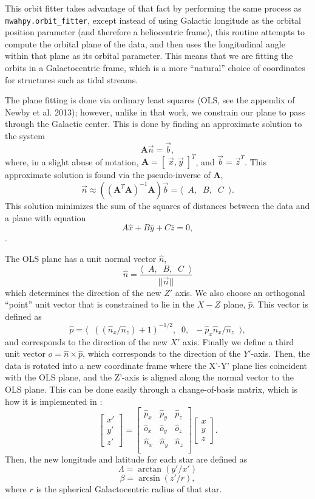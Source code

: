 \documentclass{article}
\begin{document}
This orbit fitter takes advantage of that fact by performing the same process as \verb!mwahpy.orbit_fitter!, except instead of using Galactic longitude as the orbital position parameter (and therefore a heliocentric frame), this routine attempts to compute the orbital plane of the data, and then uses the longitudinal angle within that plane as its orbital parameter. This means that we are fitting the orbits in a Galactocentric frame, which is a more ``natural'' choice of coordinates for structures such as tidal streams. 

The plane fitting is done via ordinary least squares (OLS, see the appendix of Newby et al. 2013); however, unlike in that work, we constrain our plane to pass through the Galactic center. This is done by finding an approximate solution to the system \[
\mathbf{A} \vec{n} = \vec{b},
\] where, in a slight abuse of notation, $\mathbf{A} = [ \;\vec{x}, \vec{y}\; ]^T$, and $\vec{b} = \vec{z}^T$. This approximate solution is found via the pseudo-inverse of $\mathbf{A}$, \[
\vec{n} \approx \left( \left(\mathbf{A}^T \mathbf{A}\right)^{-1} \mathbf{A} \right) \vec{b} = \langle\;\; A,\;\; B, \;\; C \;\; \rangle.
\] This solution minimizes the sum of the squares of distances between the data and a plane with equation \[
A\hat{x} + B\hat{y} + C\hat{z} = 0,
\].

The OLS plane has a unit normal vector $\hat{n}$, \[
\hat{n} = \frac{\langle \;\; A, \;\; B, \;\; C \;\; \rangle}{||\vec{n}||}
\] which determines the direction of the new $Z'$ axis. We also choose an orthogonal ``point'' unit vector that is constrained to lie in the $X-Z$ plane, $\hat{p}$. This vector is defined as \[
\hat{p} = \langle \;\; \left( (\hat{n}_x / \hat{n}_z) + 1 \right)^{-1/2},\;\; 0,\;\; -\hat{p}_x \hat{n}_x / \hat{n}_z \;\; \rangle,
\] and corresponds to the direction of the new $X'$ axis. Finally we define a third unit vector $\hat{o} =  \hat{n} \times \hat{p}$, which corresponds to the direction of the $Y'$-axis. Then, the data is rotated into a new coordinate frame where the X'-Y' plane lies coincident with the OLS plane, and the Z'-axis is aligned along the normal vector to the OLS plane. This can be done easily through a change-of-basis matrix, which is how it is implemented in \mwahpy: \[
\left[\begin{array}{r}
x' \\
y' \\
z'
\end{array}\right] = \left[\begin{array}{rrr}
\hat{p}_x & \hat{p}_y & \hat{p}_z \\
\hat{o}_x & \hat{o}_y & \hat{o}_z \\
\hat{n}_x & \hat{n}_y & \hat{n}_z \\
\end{array}\right] \left[\begin{array}{r}
x \\
y \\
z
\end{array}\right].
\] Then, the new longitude and latitude for each star are defined as \[
\Lambda = \arctan (y'/x')
\]\[
\beta = \arcsin (z'/r),
\] where $r$ is the spherical Galactocentric radius of that star.
\end{document}
